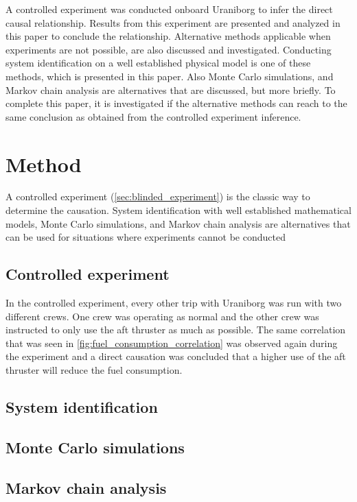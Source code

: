 \documentclass[fleqn,10pt]{olplainarticle}
\begin{document}
A controlled experiment was conducted onboard Uraniborg to infer the direct causal relationship. Results from this experiment are presented and analyzed in this paper to conclude the relationship. Alternative methods applicable when experiments are not possible, are also discussed and investigated. Conducting system identification on a well established physical model is one of these methods, which is presented in this paper. Also Monte Carlo simulations, and Markov chain analysis are alternatives that are discussed, but more briefly. To complete this paper, it is investigated if the alternative methods can reach to the same conclusion as obtained from the controlled experiment inference.

\section{Method}
A controlled experiment (\autoref{sec:blinded_experiment}) is the classic way to determine the causation. System identification with well established mathematical models, Monte Carlo simulations, and Markov chain analysis are alternatives that can be used for situations where experiments cannot be conducted

\subsection{Controlled experiment}\label{sec:blinded_experiment}
In the controlled experiment, every other trip with Uraniborg was run with two different crews. One crew was operating as normal and the other crew was instructed to only use the aft thruster as much as possible. The same correlation that was seen in \autoref{fig:fuel_consumption_correlation} was observed again during the experiment and a direct causation was concluded that a higher use of the aft thruster will reduce the fuel consumption.

\subsection{System identification}
\subsection{Monte Carlo simulations}
\subsection{Markov chain analysis}




\end{document}
